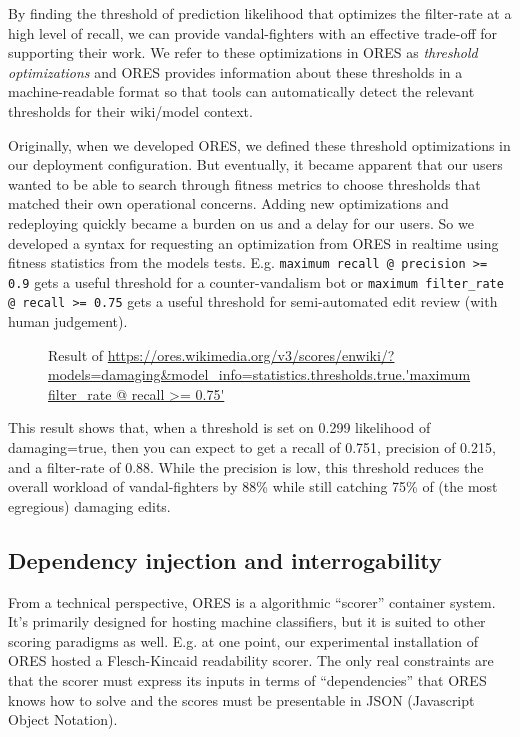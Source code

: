 By finding the threshold of prediction likelihood that optimizes the filter-rate at a high level of recall, we can provide vandal-fighters with an effective trade-off for supporting their work.  We refer to these optimizations in ORES as \emph{threshold optimizations} and ORES provides information about these thresholds in a machine-readable format so that tools can automatically detect the relevant thresholds for their wiki/model context.

Originally, when we developed ORES, we defined these threshold optimizations in our deployment configuration.  But eventually, it became apparent that our users wanted to be able to search through fitness metrics to choose thresholds that matched their own operational concerns.  Adding new optimizations and redeploying quickly became a burden on us and a delay for our users.  So we developed a syntax for requesting an optimization from ORES in realtime using fitness statistics from the models tests. E.g. \texttt{maximum recall @ precision >= 0.9} gets a useful threshold for a counter-vandalism bot or \texttt{maximum filter\_rate @ recall >= 0.75} gets a useful threshold for semi-automated edit review (with human judgement).

\begin{figure}[htbp]
        \caption{Result of \url{https://ores.wikimedia.org/v3/scores/enwiki/?models=damaging&model_info=statistics.thresholds.true.'maximum filter_rate @ recall >= 0.75'}}
        \label{fig:english_damaging_threshold_optimization}
\end{figure}

This result shows that, when a threshold is set on 0.299 likelihood of damaging=true, then you can expect to get a recall of 0.751, precision of 0.215, and a filter-rate of 0.88.  While the precision is low, this threshold reduces the overall workload of vandal-fighters by 88\% while still catching 75\% of (the most egregious) damaging edits.

\subsection{Dependency injection and interrogability}
From a technical perspective, ORES is a algorithmic ``scorer'' container system.  It's primarily designed for hosting machine classifiers, but it is suited to other scoring paradigms as well.  E.g. at one point, our experimental installation of ORES hosted a Flesch-Kincaid readability scorer.  The only real constraints are that the scorer must express its inputs in terms of ``dependencies'' that ORES knows how to solve and the scores must be presentable in JSON (Javascript Object Notation).


